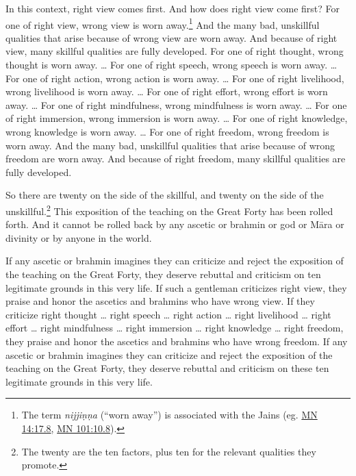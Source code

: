 \documentclass[12pt,openany]{book}%
\begin{document}
In this context, right view comes first. And how does right view come first? For one of right view, wrong view is worn away.\footnote{The term \textit{\textsanskrit{nijjiṇṇa}} (“worn away”) is associated with the Jains (eg. \href{https://suttacentral.net/mn14/en/sujato\#17.8}{MN 14:17.8}, \href{https://suttacentral.net/mn101/en/sujato\#10.8}{MN 101:10.8}). } And the many bad, unskillful qualities that arise because of wrong view are worn away. And because of right view, many skillful qualities are fully developed. For one of right thought, wrong thought is worn away. … For one of right speech, wrong speech is worn away. … For one of right action, wrong action is worn away. … For one of right livelihood, wrong livelihood is worn away. … For one of right effort, wrong effort is worn away. … For one of right mindfulness, wrong mindfulness is worn away. … For one of right immersion, wrong immersion is worn away. … For one of right knowledge, wrong knowledge is worn away. … For one of right freedom, wrong freedom is worn away. And the many bad, unskillful qualities that arise because of wrong freedom are worn away. And because of right freedom, many skillful qualities are fully developed. 

So there are twenty on the side of the skillful, and twenty on the side of the unskillful.\footnote{The twenty are the ten factors, plus ten for the relevant qualities they promote. } This exposition of the teaching on the Great Forty has been rolled forth. And it cannot be rolled back by any ascetic or brahmin or god or \textsanskrit{Māra} or divinity or by anyone in the world. 

If any ascetic or brahmin imagines they can criticize and reject the exposition of the teaching on the Great Forty, they deserve rebuttal and criticism on ten legitimate grounds in this very life. If such a gentleman criticizes right view, they praise and honor the ascetics and brahmins who have wrong view. If they criticize right thought … right speech … right action … right livelihood … right effort … right mindfulness … right immersion … right knowledge … right freedom, they praise and honor the ascetics and brahmins who have wrong freedom. If any ascetic or brahmin imagines they can criticize and reject the exposition of the teaching on the Great Forty, they deserve rebuttal and criticism on these ten legitimate grounds in this very life. 
\end{document}
